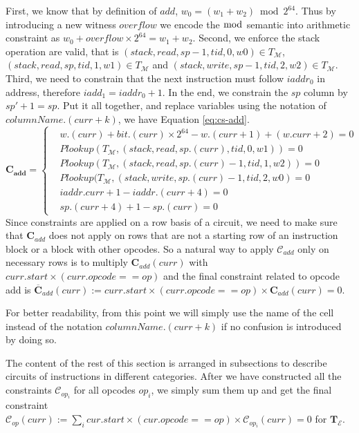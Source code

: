 First, we know that by definition of $add$, $w_0 = (w_1+w_2) \bmod 2^{64}$. Thus by introducing a new witness $overflow$ we encode the $\bmod$ semantic into arithmetic constraint as $w_0 + overflow \times 2^{64}= w_1 + w_2$. Second, we enforce the stack operation are valid, that is $(stack, read, sp-1, tid, 0, w0) \in T_\mathcal{M}$, $(stack, read, sp, tid, 1, w1) \in T_\mathcal{M}$ and $(stack, write, sp-1, tid, 2, w2) \in T_\mathcal{M}$. Third, we need to constrain that the next instruction must follow $iaddr_0$ in address, therefore $iadd_1 = iaddr_0 + 1$. In the end, we constrain the $sp$ column by $sp' + 1= sp$. Put it all together, and replace variables using the notation of $columnName.(curr + k)$, we have Equation \ref{eq:cs-add}.
\begin{equation}
    \mathbf{C_{add}} = \begin{cases}
        &w.(curr) + bit.(curr) \times 2^{64} - w.(curr+1) + (w.curr + 2) = 0 \\
        &Plookup(T_\mathcal{M}, (stack, read, sp.(curr), tid, 0, w1)) = 0 \\
        &Plookup(T_\mathcal{M}, (stack, read, sp.(curr)-1, tid, 1, w2)) = 0 \\
        &Plookup(T_\mathcal{M}, (stack, write, sp.(curr)-1, tid, 2, w0) = 0 \\
        &iaddr.curr + 1 - iaddr.(curr + 4) = 0\\
        &sp.(curr+4) + 1 - sp.(curr)  = 0
    \end{cases}
    \label{eq:cs-add}
\end{equation}
Since constraints are applied on a row basis of a circuit, we need to make sure that $\mathbf{C}_{add}$ does not apply on rows that are not a starting row of an instruction block or a block with other opcodes. So a natural way to apply $\mathcal{C}_{add}$ only on necessary rows is to multiply $\mathbf{C}_{add}(curr)$ with $curr.start \times (curr.opcode == op)$ and the final constraint related to opcode add is $\overline{\mathbf{C}}_{add}(curr) := curr.start \times (curr.opcode == op) \times \mathbf{C}_{add}(curr) = 0$. 

\begin{remark}
For better readability, from this point we will simply use the name of the cell instead of the notation $columnName.(curr + k)$ if no confusion is introduced by doing so.
\end{remark}

\noindent The content of the rest of this section is arranged in subsections to describe circuits of instructions in different categories. After we have constructed all the constraints $\mathcal{C}_{op_i}$ for all opcodes $op_i$, we simply sum them up and get the final constraint $\mathcal{C}_{op}(curr) := \sum_i cur.start \times (cur.opcode == op) \times \mathcal{C}_{op_i}(curr) = 0$ for $\mathbf{T}_\mathcal{E}$.


